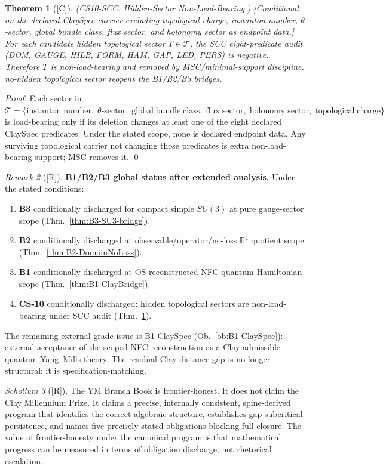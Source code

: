 \documentclass[12pt,oneside]{amsbook}
\theoremstyle{plain}
\newtheorem{theorem}{Theorem}[section]
\theoremstyle{definition}
\theoremstyle{remark}
\newtheorem{remark}[theorem]{Remark}
\newtheorem{scholium}[theorem]{Scholium}
\newcommand{\status}[1]{\textup{[#1]}}
\begin{document}
\begin{theorem}[\status{C}]\label{thm:CS10-SCC}
\textup{(CS10-SCC: Hidden-Sector Non-Load-Bearing.)}
\textup{[Conditional on the declared ClaySpec carrier excluding
topological charge, instanton number, $\theta$-sector, global bundle
class, flux sector, and holonomy sector as endpoint data.]}
For each candidate hidden topological sector $T \in \mathcal{T}$,
the SCC eight-predicate audit (DOM, GAUGE, HILB, FORM, HAM, GAP, LED,
PERS) is negative. Therefore $T$ is non-load-bearing and removed
by MSC/minimal-support discipline. no-hidden topological sector
reopens the B1/B2/B3 bridges.
\end{theorem}

\begin{proof}
Each sector in $\mathcal{T} = \{\mathrm{instanton\;number},\;
\theta\text{-sector},\;\mathrm{global\;bundle\;class},\;\mathrm{flux\;sector},\;
\mathrm{holonomy\;sector},\;\mathrm{topological\;charge}\}$
is load-bearing only if its deletion changes at least one of the eight
declared ClaySpec predicates. Under the stated scope, none is declared
endpoint data. Any surviving topological carrier not changing those
predicates is extra non-load-bearing support; MSC removes it.
\qed
\end{proof}

\begin{remark}[\status{R}]\label{rem:B1-status}
\textbf{B1/B2/B3 global status after extended analysis.}
Under the stated conditions:
\begin{enumerate}[label=\textup{(\arabic*)}]
 \item \textbf{B3} conditionally discharged for compact simple
 $SU(3)$ at pure gauge-sector scope
 (Thm.~\ref{thm:B3-SU3-bridge}).
 \item \textbf{B2} conditionally discharged at
 observable/operator/no-loss $\mathbb{R}^4$ quotient scope
 (Thm.~\ref{thm:B2-DomainNoLoss}).
 \item \textbf{B1} conditionally discharged at OS-reconstructed
 NFC quantum-Hamiltonian scope (Thm.~\ref{thm:B1-ClayBridge}).
 \item \textbf{CS-10} conditionally discharged: hidden topological
 sectors are non-load-bearing under SCC audit
 (Thm.~\ref{thm:CS10-SCC}).
\end{enumerate}
The remaining external-grade issue is B1-ClaySpec
(Ob.~\ref{ob:B1-ClaySpec}): external acceptance of the scoped
NFC reconstruction as a Clay-admissible quantum Yang--Mills theory.
The residual Clay-distance gap is no longer structural; it is
specification-matching.
\end{remark}

\begin{scholium}[\status{R}]
The YM Branch Book is frontier-honest. It does not claim the
Clay Millennium Prize. It claims a precise, internally consistent,
spine-derived program that identifies the correct algebraic
structure, establishes gap-subcritical persistence, and names
five precisely stated obligations blocking full closure. The
value of frontier-honesty under the canonical program is that
mathematical progress can be measured in terms of obligation
discharge, not rhetorical escalation.
\end{scholium}
\end{document}
